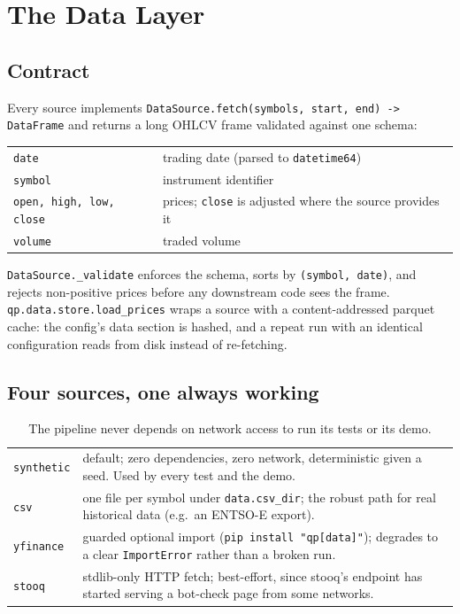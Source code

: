 \chapter{The Data Layer}

\section{Contract}

Every source implements \texttt{DataSource.fetch(symbols, start, end) -\/> DataFrame}
and returns a long OHLCV frame validated against one schema:

\begin{table}[h]
\footnotesize
\centering
\begin{tabularx}{\textwidth}{L{2.2cm} X}
\toprule
{} &  \\
\midrule
\texttt{date} & trading date (parsed to \texttt{datetime64}) \\
\texttt{symbol} & instrument identifier \\
\texttt{open, high, low, close} & prices; \texttt{close} is adjusted where the source provides it \\
\texttt{volume} & traded volume \\
\bottomrule
\end{tabularx}
\end{table}

\texttt{DataSource.\_validate} enforces the schema, sorts by \texttt{(symbol, date)},
and rejects non-positive prices before any downstream code sees the frame.
\texttt{qp.data.store.load\_prices} wraps a source with a content-addressed
parquet cache: the config's data section is hashed, and a repeat run with an
identical configuration reads from disk instead of re-fetching.

\section{Four sources, one always working}

\begin{table}[h]
\footnotesize
\centering
\begin{tabularx}{\textwidth}{L{2.6cm} X}
\toprule
{} &  \\
\midrule
\texttt{synthetic} & default; zero dependencies, zero network, deterministic given a seed. Used by every test and the demo. \\
\texttt{csv} & one file per symbol under \texttt{data.csv\_dir}; the robust path for real historical data (e.g.\ an ENTSO-E export). \\
\texttt{yfinance} & guarded optional import (\texttt{pip install "qp[data]"}); degrades to a clear \texttt{ImportError} rather than a broken run. \\
\texttt{stooq} & stdlib-only HTTP fetch; best-effort, since stooq's endpoint has started serving a bot-check page from some networks. \\
\bottomrule
\end{tabularx}
\caption{The pipeline never depends on network access to run its tests or its demo.}
\end{table}

